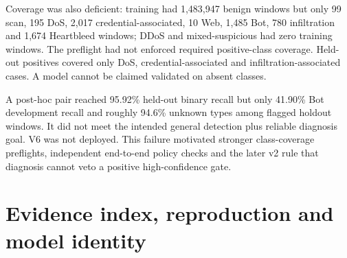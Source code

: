 \documentclass[11pt,a4paper,oneside]{report}
\begin{document}
Coverage was also deficient: training had 1,483,947 benign windows but only 99 scan, 195 DoS, 2,017 credential-associated, 10 Web, 1,485 Bot, 780 infiltration and 1,674 Heartbleed windows; DDoS and mixed-suspicious had zero training windows. The preflight had not enforced required positive-class coverage. Held-out positives covered only DoS, credential-associated and infiltration-associated cases. A model cannot be claimed validated on absent classes.

A post-hoc pair reached 95.92\% held-out binary recall but only 41.90\% Bot development recall and roughly 94.6\% unknown types among flagged holdout windows. It did not meet the intended general detection plus reliable diagnosis goal. V6 was not deployed. This failure motivated stronger class-coverage preflights, independent end-to-end policy checks and the later v2 rule that diagnosis cannot veto a positive high-confidence gate.

\chapter{Evidence index, reproduction and model identity}
\end{document}
